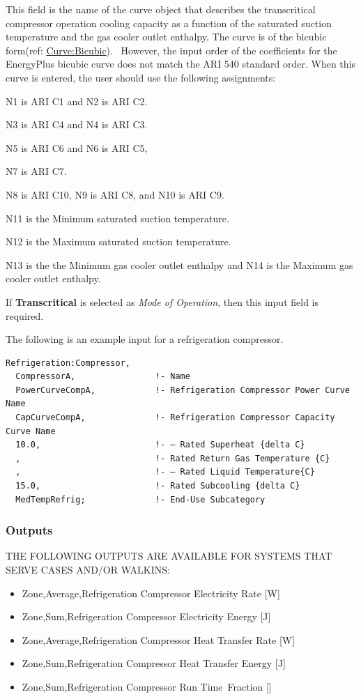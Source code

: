 This field is the name of the curve object that describes the transcritical compressor operation cooling capacity as a function of the saturated suction temperature and the gas cooler outlet enthalpy. The curve is of the bicubic form(ref: \hyperref[curvebicubic]{Curve:Bicubic}).~ However, the input order of the coefficients for the EnergyPlus bicubic curve does not match the ARI 540 standard order. When this curve is entered, the user should use the following assignments:

N1 is ARI C1 and N2 is ARI C2.

N3 is ARI C4 and N4 is ARI C3.

N5 is ARI C6 and N6 is ARI C5,

N7 is ARI C7.

N8 is ARI C10, N9 is ARI C8, and N10 is ARI C9.

N11 is the Minimum saturated suction temperature.

N12 is the Maximum saturated suction temperature.

N13 is the the Minimum gas cooler outlet enthalpy and N14 is the Maximum gas cooler outlet enthalpy.

If \textbf{Transcritical} is selected as \textit{Mode of Operation}, then this input field is required.

The following is an example input for a refrigeration compressor.

\begin{lstlisting}
Refrigeration:Compressor,
  CompressorA,                !- Name
  PowerCurveCompA,            !- Refrigeration Compressor Power Curve Name
  CapCurveCompA,              !- Refrigeration Compressor Capacity Curve Name
  10.0,                       !- – Rated Superheat {delta C}
  ,                           !- Rated Return Gas Temperature {C}
  ,                           !- – Rated Liquid Temperature{C}
  15.0,                       !- Rated Subcooling {delta C}
  MedTempRefrig;              !- End-Use Subcategory
\end{lstlisting}

\subsubsection{Outputs}\label{outputs-4-013}

THE FOLLOWING OUTPUTS ARE AVAILABLE FOR SYSTEMS THAT SERVE CASES AND/OR WALKINS:

\begin{itemize}
\item
  Zone,Average,Refrigeration Compressor Electricity Rate {[}W{]}
\item
  Zone,Sum,Refrigeration Compressor Electricity Energy {[}J{]}
\item
  Zone,Average,Refrigeration Compressor Heat Transfer Rate {[}W{]}
\item
  Zone,Sum,Refrigeration Compressor Heat Transfer Energy {[}J{]}
\item
  Zone,Sum,Refrigeration Compressor Run Time~Fraction {[]}
\end{itemize}

